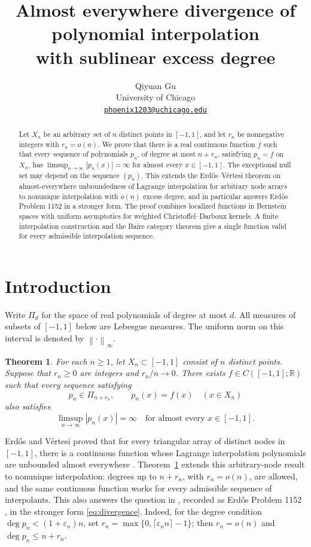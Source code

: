 \documentclass[11pt]{article}
\title{Almost everywhere divergence of polynomial interpolation\\
with sublinear excess degree}
\author{Qiyuan Gu\\
University of Chicago\\
\href{mailto:phoenix1203@uchicago.edu}{\texttt{phoenix1203@uchicago.edu}}}
\date{}
\newtheorem{theorem}{Theorem}
\theoremstyle{definition}
\numberwithin{equation}{section}
\newcommand{\R}{\mathbb R}
\newcommand{\norm}[1]{\left\lVert #1\right\rVert}
\begin{document}
\maketitle

\begin{abstract}
Let \(X_n\) be an arbitrary set of \(n\) distinct points in \([-1,1]\),
and let \(r_n\) be nonnegative integers with \(r_n=o(n)\).
We prove that there is a real continuous function \(f\) such that every
sequence of polynomials \(p_n\), of degree at most \(n+r_n\), satisfying
\(p_n=f\) on \(X_n\), has
\(\limsup_{n\to\infty}|p_n(x)|=\infty\) for almost every \(x\in[-1,1]\).
The exceptional null set may depend on the sequence \((p_n)\).
This extends the Erd\H{o}s--V\'ertesi theorem on almost-everywhere
unboundedness of Lagrange interpolation for arbitrary node arrays to
nonunique interpolation with \(o(n)\) excess degree, and in particular
answers Erd\H{o}s Problem 1152 in a stronger form. The proof combines
localized functions in Bernstein spaces with uniform asymptotics for
weighted Christoffel--Darboux kernels. A finite interpolation construction
and the Baire category theorem give a single function valid for every
admissible interpolation sequence.
\end{abstract}

\section{Introduction}

Write \(\Pi_d\) for the space of real polynomials of degree at most \(d\).
All measures of subsets of \([-1,1]\) below are Lebesgue measures.
The uniform norm on this interval is denoted by \(\norm{\cdot}_\infty\).

\begin{theorem}\label{thm:main}
For each \(n\ge1\), let \(X_n\subset[-1,1]\) consist of \(n\) distinct
points. Suppose that \(r_n\ge0\) are integers and \(r_n/n\to0\).
There exists \(f\in C([-1,1];\R)\) such that every sequence satisfying
\[
 p_n\in\Pi_{n+r_n},
 \qquad p_n(x)=f(x)\quad(x\in X_n)
\]
also satisfies
\begin{equation}\label{eq:divergence}
 \limsup_{n\to\infty}|p_n(x)|=\infty
 \quad\text{for almost every }x\in[-1,1].
\end{equation}
\end{theorem}

Erd\H{o}s and V\'ertesi proved that for every triangular array of
distinct nodes in \([-1,1]\), there is a continuous function whose
Lagrange interpolation polynomials are unbounded almost everywhere
\cite{EV80,EV81}. Theorem~\ref{thm:main} extends this arbitrary-node
result to nonunique interpolation: degrees up to \(n+r_n\), with
\(r_n=o(n)\), are allowed, and the same continuous function works for
every admissible sequence of interpolants. This also answers the question
in \cite[Problem~2.42]{Favorite99}, recorded as Erd\H{o}s Problem 1152
\cite{Erdos1152}, in the stronger form \eqref{eq:divergence}.
Indeed, for the degree condition \(\deg p_n<(1+\varepsilon_n)n\),
set \(r_n=\max\{0,\lceil\varepsilon_n n\rceil-1\}\); then
\(r_n=o(n)\) and \(\deg p_n\le n+r_n\).
\end{document}
